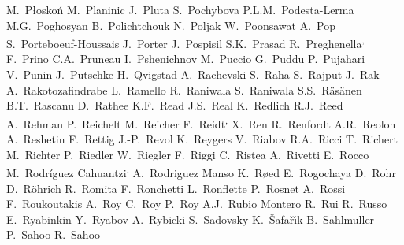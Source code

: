 \begin{flushleft}
M.~P\l osko\'{n}\And
M.~Planinic\And
J.~Pluta\And
S.~Pochybova\And
P.L.M.~Podesta-Lerma\And
M.G.~Poghosyan\And
B.~Polichtchouk\And
N.~Poljak\And
W.~Poonsawat\And
A.~Pop\And
S.~Porteboeuf-Houssais\And
J.~Porter\And
J.~Pospisil\And
S.K.~Prasad\And
R.~Preghenella\textsuperscript{,}\And
F.~Prino\And
C.A.~Pruneau\And
I.~Pshenichnov\And
M.~Puccio\And
G.~Puddu\And
P.~Pujahari\And
V.~Punin\And
J.~Putschke\And
H.~Qvigstad\And
A.~Rachevski\And
S.~Raha\And
S.~Rajput\And
J.~Rak\And
A.~Rakotozafindrabe\And
L.~Ramello\And
R.~Raniwala\And
S.~Raniwala\And
S.S.~R\"{a}s\"{a}nen\And
B.T.~Rascanu\And
D.~Rathee\And
K.F.~Read\And
J.S.~Real\And
K.~Redlich\And
R.J.~Reed\And
A.~Rehman\And
P.~Reichelt\And
M.~Reicher\And
F.~Reidt\textsuperscript{,}\And
X.~Ren\And
R.~Renfordt\And
A.R.~Reolon\And
A.~Reshetin\And
F.~Rettig\And
J.-P.~Revol\And
K.~Reygers\And
V.~Riabov\And
R.A.~Ricci\And
T.~Richert\And
M.~Richter\And
P.~Riedler\And
W.~Riegler\And
F.~Riggi\And
C.~Ristea\And
A.~Rivetti\And
E.~Rocco\And
M.~Rodr\'{i}guez Cahuantzi\textsuperscript{,}\And
A.~Rodriguez Manso\And
K.~R{\o}ed\And
E.~Rogochaya\And
D.~Rohr\And
D.~R\"ohrich\And
R.~Romita\And
F.~Ronchetti\And
L.~Ronflette\And
P.~Rosnet\And
A.~Rossi\And
F.~Roukoutakis\And
A.~Roy\And
C.~Roy\And
P.~Roy\And
A.J.~Rubio Montero\And
R.~Rui\And
R.~Russo\And
E.~Ryabinkin\And
Y.~Ryabov\And
A.~Rybicki\And
S.~Sadovsky\And
K.~\v{S}afa\v{r}\'{\i}k\And
B.~Sahlmuller\And
P.~Sahoo\And
R.~Sahoo\And

\end{flushleft}

